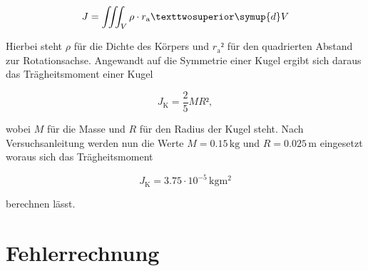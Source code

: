 \begin{equation*}
    J = \iiint_V \rho \cdot r_\text{a}² \symup{d}V
\end{equation*}

\noindent Hierbei steht $\rho$ für die Dichte des Körpers und $r_\text{a}²$ für den quadrierten Abstand zur Rotationsachse.
Angewandt auf die Symmetrie einer Kugel ergibt sich daraus das Trägheitsmoment einer Kugel

\begin{equation*}
    J_\text{K} = \frac{2}{5}MR²,
\end{equation*}

\noindent wobei $M$ für die Masse und $R$ für den Radius der Kugel steht. Nach Versuchsanleitung werden nun die Werte $M = 0.15\,\unit{\kilo\gram}$
und $R = 0.025\,\unit{\meter}$ eingesetzt woraus sich das Trägheitsmoment

\begin{equation*}
    J_\text{K} = 3.75 \cdot 10^{-5}\,\unit{\kilo\gram\meter\squared}
\end{equation*}

\noindent berechnen lässt.
\section{Fehlerrechnung}
